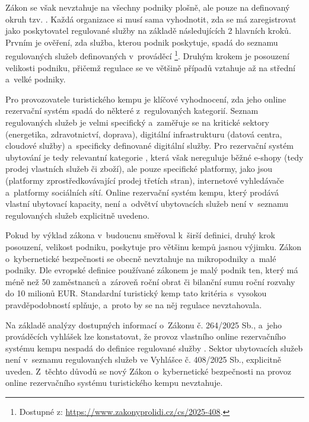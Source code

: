 Zákon se však nevztahuje na všechny podniky plošně, ale pouze na definovaný okruh tzv. .
Každá organizace si musí sama vyhodnotit, zda se má zaregistrovat jako poskytovatel regulované služby na základě následujících 2 hlavních kroků.
Prvním je ověření, zda služba, kterou podnik poskytuje, spadá do seznamu regulovaných služeb definovaných v~prováděcí \footnote{Dostupné z: \url{https://www.zakonyprolidi.cz/cs/2025-408}.}.
Druhým krokem je posouzení velikosti podniku, přičemž regulace se ve většině případů vztahuje až na střední a~velké podniky.   

Pro provozovatele turistického kempu je klíčové vyhodnocení, zda jeho online rezervační systém spadá do některé z~regulovaných kategorií.
Seznam regulovaných služeb je velmi specifický a~zaměřuje se na kritické sektory (energetika, zdravotnictví, doprava), digitální infrastrukturu (datová centra, cloudové služby) a~specificky definované digitální služby.
Pro rezervační systém ubytování je tedy relevantní kategorie , která však nereguluje běžné e-shopy (tedy prodej vlastních služeb či zboží), ale pouze specifické platformy, jako jsou  (platformy zprostředkovávající prodej třetích stran), internetové vyhledávače a~platformy sociálních sítí.
Online rezervační systém kempu, který prodává vlastní ubytovací kapacity, není  a~odvětví ubytovacích služeb není v~seznamu regulovaných služeb explicitně uvedeno.   

Pokud by výklad zákona v~budoucnu směřoval k~širší definici, druhý krok posouzení, velikost podniku, poskytuje pro většinu kempů jasnou výjimku.
Zákon o~kybernetické bezpečnosti se obecně nevztahuje na mikropodniky a~malé podniky.
Dle evropské definice používané zákonem je malý podnik ten, který má méně než 50 zaměstnanců a~zároveň roční obrat či bilanční sumu roční rozvahy do 10 milionů EUR.
Standardní turistický kemp tato kritéria s~vysokou pravděpodobností splňuje, a~proto by se na něj regulace nevztahovala.

Na základě analýzy dostupných informací o~Zákonu č. 264/2025 Sb., a~jeho prováděcích vyhlášek  lze konstatovat, že provoz vlastního online rezervačního systému kempu nespadá do definice regulované služby .   
Sektor ubytovacích služeb není v~seznamu regulovaných služeb ve Vyhlášce č. 408/2025 Sb., explicitně uveden.   
Z~těchto důvodů se nový Zákon o~kybernetické bezpečnosti na provoz online rezervačního systému turistického kempu nevztahuje.

